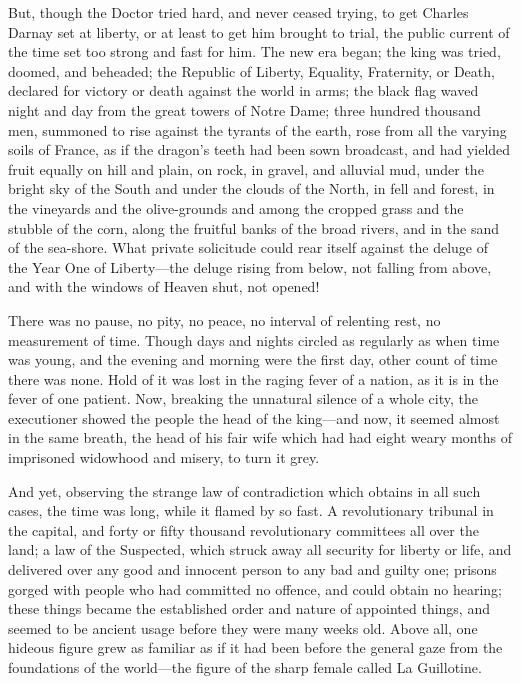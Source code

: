 But, though the Doctor tried hard, and never ceased trying, to get
Charles Darnay set at liberty, or at least to get him brought to trial,
the public current of the time set too strong and fast for him.
The new era began; the king was tried, doomed, and beheaded; the
Republic of Liberty, Equality, Fraternity, or Death, declared for
victory or death against the world in arms; the black flag waved
night and day from the great towers of Notre Dame; three hundred
thousand men, summoned to rise against the tyrants of the earth, rose
from all the varying soils of France, as if the dragon's teeth had
been sown broadcast, and had yielded fruit equally on hill and plain,
on rock, in gravel, and alluvial mud, under the bright sky of the
South and under the clouds of the North, in fell and forest, in the
vineyards and the olive-grounds and among the cropped grass and the
stubble of the corn, along the fruitful banks of the broad rivers,
and in the sand of the sea-shore.  What private solicitude could rear
itself against the deluge of the Year One of Liberty---the deluge
rising from below, not falling from above, and with the windows of
Heaven shut, not opened!

There was no pause, no pity, no peace, no interval of relenting rest,
no measurement of time.  Though days and nights circled as regularly
as when time was young, and the evening and morning were the first
day, other count of time there was none.  Hold of it was lost in the
raging fever of a nation, as it is in the fever of one patient.
Now, breaking the unnatural silence of a whole city, the executioner
showed the people the head of the king---and now, it seemed almost in
the same breath, the head of his fair wife which had had eight weary
months of imprisoned widowhood and misery, to turn it grey.

And yet, observing the strange law of contradiction which obtains in
all such cases, the time was long, while it flamed by so fast.
A revolutionary tribunal in the capital, and forty or fifty thousand
revolutionary committees all over the land; a law of the Suspected,
which struck away all security for liberty or life, and delivered
over any good and innocent person to any bad and guilty one; prisons
gorged with people who had committed no offence, and could obtain no
hearing; these things became the established order and nature of
appointed things, and seemed to be ancient usage before they were
many weeks old.  Above all, one hideous figure grew as familiar as if
it had been before the general gaze from the foundations of the
world---the figure of the sharp female called La Guillotine.

